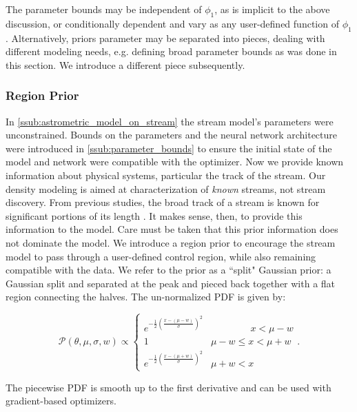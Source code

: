\documentclass[twocolumn]{aastex631}
\newcommand{\mcal}[1]{\mathcal{#1}}
\newcommand{\Exp}[1]{e^{#1}}
\newcommand{\pdf}{\mcal{P}}
\begin{document}
            The parameter bounds may be independent of $\phi_1$, as is implicit to the above discussion, or conditionally dependent and vary as any user-defined function of $\phi_1$.
            Alternatively, priors parameter may be separated into pieces, dealing with different modeling needs, e.g. defining broad parameter bounds as was done in this section.
            We introduce a different piece subsequently.


        \subsubsection{Region Prior} \label{sub:track_region_prior}

            In \autoref{ssub:astrometric_model_on_stream} the stream model's parameters were unconstrained. Bounds on the parameters and the neural network architecture were introduced in \autoref{ssub:parameter_bounds} to ensure the initial state of the model and network were compatible with the optimizer. Now we provide known information about physical systems, particular the track of the stream.
            Our density modeling is aimed at characterization of \textit{known} streams, not stream discovery. From previous studies, the broad track of a
            stream is known for significant portions of its length \citep[e.g. see the atlas in][]{Mateu2022}. It makes sense, then, to provide this information to the model. Care must be taken that this prior information does not dominate the model.
            We introduce a region prior to encourage the stream model to pass through a user-defined control region, while also remaining compatible with the data.
            We refer to the prior as a ``split" Gaussian prior: a Gaussian split and separated at the peak and pieced back together with a flat region connecting the halves. The un-normalized PDF is given by:
            \begin{small}
            \begin{equation}
                \pdf(\theta,\mu,\sigma,w) \propto \begin{cases} 
                   \Exp{-\frac{1}{2}\left(\frac{x-(\mu-w)}{\sigma}\right)^2} & \phantom{\mu - w <}\ x < \mu - w \\
                    1 & \mu - w \leq x < \mu + w \\
                    \Exp{-\frac{1}{2}\left(\frac{x-(\mu+w)}{\sigma}\right)^2} & \mu + w < x
                \end{cases}.
            \end{equation}\end{small}
            The piecewise PDF is smooth up to the first derivative and can be used with gradient-based optimizers.
    
\end{document}
